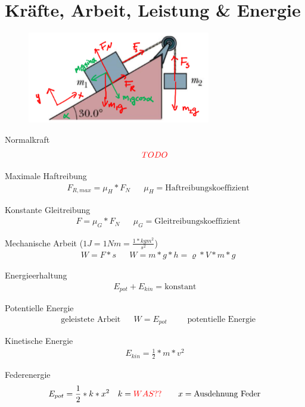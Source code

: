 \documentclass[17pt]{extarticle}
\begin{document}
\section{Kräfte, Arbeit, Leistung \& Energie}
	\begin{figure}[h!]
		\centering
		\includegraphics[width=8cm]{img/Haftreibung.png}
	\end{figure}
	
	Normalkraft
	\begin{align}
		\textcolor{red}{TODO}
	\end{align}
	
	Maximale Haftreibung
	\begin{align}
		&F_{R,max} = \mu_{H} * F_{N}
		&&\mu_{H} = \text{Haftreibungskoeffizient} 
	\end{align}

	Konstante Gleitreibung
	\begin{align}
		&F = \mu_{G} * F_{N}
		&&\mu_{G} = \text{Gleitreibungskoeffizient}		
	\end{align}

	Mechanische Arbeit \small{($1J = 1Nm = \frac{1*kg m^{2}}{s^{2}}$)}
	\begin{align}
		&W = F * s 
		&&W = m * g * h = \varrho * V * m * g
	\end{align}

	Energieerhaltung
	\begin{align}
		E_{pot} + E_{kin} = \text{konstant}
	\end{align}
	
	Potentielle Energie
	\begin{align}
		&\text{geleistete Arbeit} 
		&&W = E_{pot} 
		&&&\text{potentielle Energie}
	\end{align}
	
	Kinetische Energie
	\begin{align}
		E_{kin} = \frac{1}{2} * m * v^{2}
	\end{align}
	
	Federenergie
	\begin{align}
		&E_{pot} = \frac{1}{2} * k * x^{2}
		&&k = \textcolor{red}{WAS??}
		&&&x = \text{Ausdehnung Feder}
	\end{align}
	
\end{document}
